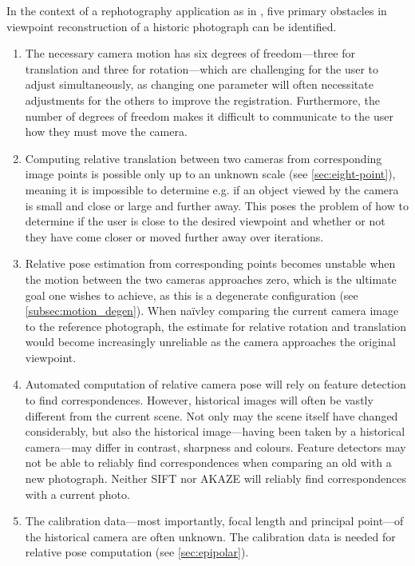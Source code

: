 In the context of a rephotography application as in \citep{bae2010}, five
primary obstacles in viewpoint reconstruction of a historic photograph can be
identified.
\begin{enumerate}
   \item The necessary camera motion has six degrees of freedom---three for
      translation and three for rotation---which are challenging for the user
      to adjust simultaneously, as changing one parameter will often necessitate
      adjustments for the others to improve the registration. Furthermore, the
      number of degrees of freedom makes it difficult to communicate to the
      user how they must move the camera.
   \item Computing relative translation between two cameras from corresponding
      image points is possible only up to an unknown scale (see
      \autoref{sec:eight-point}), meaning it is impossible to
      determine e.g. if an object viewed by the camera is small and close or
      large and further away. This poses the problem of how to determine if the
      user is close to the desired viewpoint and whether or not they have come
      closer or moved further away over iterations. 
   \item Relative pose estimation from corresponding points becomes unstable
      when the motion between the two cameras approaches zero, which is the
      ultimate goal one wishes to achieve, as this is a degenerate configuration
      (see \autoref{subsec:motion_degen}). When na\"ivley comparing the current
      camera image to the reference photograph, the estimate for relative
      rotation and translation would become increasingly unreliable as the
      camera approaches the original viewpoint.
   \item Automated computation of relative camera pose will rely on feature
      detection to find correspondences. However, historical images will often
      be vastly different from the current scene. Not only may the scene itself
      have changed considerably, but also the historical image---having been
      taken by a historical camera---may differ in contrast, sharpness and
      colours. Feature detectors may not be able to reliably find
      correspondences when comparing an old with a new photograph. Neither SIFT
      nor AKAZE will reliably find correspondences with a current photo.
   \item The calibration data---most importantly, focal length and principal
      point---of the historical camera are often unknown. The calibration data
      is needed for relative pose computation (see \autoref{sec:epipolar}).
\end{enumerate}

